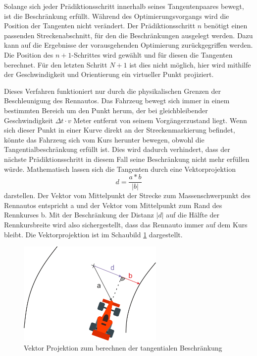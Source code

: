 \documentclass{like}
\begin{document}
Solange sich jeder Prädiktionsschritt innerhalb seines Tangentenpaares bewegt, ist die Beschränkung erfüllt. Während des Optimierungsvorgangs wird die Position der Tangenten nicht verändert. Der Prädiktionsschritt \(n\) benötigt einen passenden Streckenabschnitt, für den die Beschränkungen ausgelegt werden. Dazu kann auf die Ergebnisse der vorausgehenden Optimierung zurückgegriffen werden. Die Position des $n+1$-Schrittes wird gewählt und für diesen die Tangenten berechnet. Für den letzten Schritt \(N +1\) ist dies nicht möglich, hier wird mithilfe der Geschwindigkeit und Orientierung ein virtueller Punkt projiziert.   


Dieses Verfahren funktioniert nur durch die physikalischen Grenzen der Beschleunigung des Rennautos. Das Fahrzeug bewegt sich immer in einem bestimmten Bereich um den Punkt herum, der bei gleichbleibender Geschwindigkeit $\Delta t \cdot v$ Meter entfernt von seinem Vorgängerzustand liegt. Wenn sich dieser Punkt in einer Kurve direkt an der Streckenmarkierung befindet, könnte das Fahrzeug sich vom Kurs herunter bewegen, obwohl die Tangentialbeschränkung erfüllt ist. Dies wird dadurch verhindert, dass der nächste Prädiktionsschritt in diesem Fall seine Beschränkung nicht mehr erfüllen würde.
Mathematisch lassen sich die Tangenten durch eine Vektorprojektion 
\begin{equation}
	d = \frac{a*b}{|b|}
\end{equation}
darstellen. Der Vektor vom Mittelpunkt der Strecke zum Massenschwerpunkt des Rennautos entspricht a und der Vektor vom Mittelpunkt zum Rand des Rennkurses b. Mit der Beschränkung der Distanz $|d|$ auf die Hälfte der Rennkursbreite wird also sichergestellt, dass das Rennauto immer auf dem Kurs bleibt.
Die Vektorprojektion ist im Schaubild \ref{fig:vektorProjektion} dargestellt.

\begin{figure}[ht!]
	\centering
	\includegraphics[width=200pt]{Abbildungen/vektorProjection.png}
	\caption{Vektor Projektion zum berechnen der tangentialen Beschränkung}
	\label{fig:vektorProjektion}
\end{figure}
\end{document}
